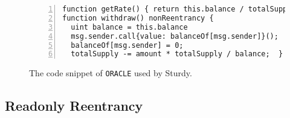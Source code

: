 



\begin{figure}[t]
\centering
\begin{lstlisting}[numbers=left,stepnumber=1,xleftmargin=1em,numberstyle=\ttfamily\color{gray},numbersep=3pt]
function getRate() { return this.balance / totalSupply; }
function withdraw() nonReentrancy {
  uint balance = this.balance
  msg.sender.call{value: balanceOf[msg.sender]}();
  balanceOf[msg.sender] = 0;
  totalSupply -= amount * totalSupply / balance;  }
\end{lstlisting}
\caption{The code snippet of \texttt{ORACLE} used by Sturdy.}
\label{fig:oracal}
\end{figure}




\iffalse
\subsection{Readonly Reentrancy}



